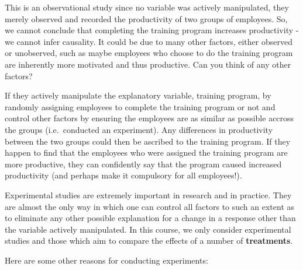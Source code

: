 \documentclass[
  letterpaper,
  DIV=11,
  numbers=noendperiod,
  oneside]{scrreprt}
\begin{document}
This is an observational study since no variable was actively
manipulated, they merely observed and recorded the productivity of two
groups of employees. So, we cannot conclude that completing the training
program increases productivity - we cannot infer causality. It could be
due to many other factors, either observed or unobserved, such as maybe
employees who choose to do the training program are inherently more
motivated and thus productive. Can you think of any other factors?

If they actively manipulate the explanatory variable, training program,
by randomly assigning employees to complete the training program or not
and control other factors by ensuring the employees are as similar as
possible accross the groups (i.e.~conducted an experiment). Any
differences in productivity between the two groups could then be
ascribed to the training program. If they happen to find that the
employees who were assigned the training program are more productive,
they can confidently say that the program caused increased productivity
(and perhaps make it compulsory for all employees!).

Experimental studies are extremely important in research and in
practice. They are almost the only way in which one can control all
factors to such an extent as to eliminate any other possible explanation
for a change in a response other than the variable actively manipulated.
In this course, we only consider experimental studies and those which
aim to compare the effects of a number of \textbf{treatments}.

Here are some other reasons for conducting experiments:
\end{document}
